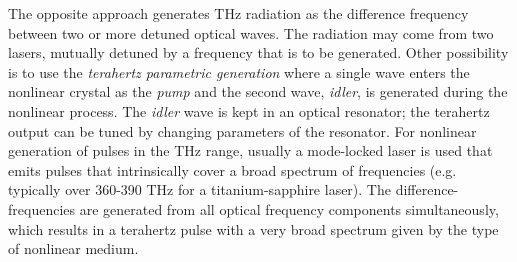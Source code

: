 The opposite approach generates THz radiation as the difference frequency between two or more detuned optical waves.
The radiation may come from two lasers, mutually detuned by a frequency that is to be generated. %
Other possibility is to use the \textit{terahertz parametric generation} where a single wave enters the nonlinear crystal as the \textit{pump} and the second wave, \textit{idler}, is generated during the nonlinear process. The \textit{idler} wave is kept in an optical resonator; the terahertz output can be tuned by changing parameters of the resonator. 
For nonlinear generation of pulses in the THz range, usually a mode-locked laser is used that emits pulses that intrinsically cover a broad spectrum of frequencies (e.g. typically over 360-390 THz for a titanium-sapphire laser). The difference-frequencies are generated from all optical frequency components simultaneously, which results in a terahertz pulse with a very broad spectrum given by the type of nonlinear medium. 

